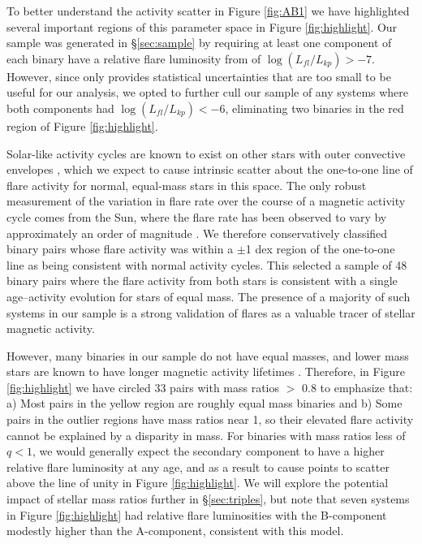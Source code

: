 \documentclass[preprint2]{aastex61}
\begin{document}
To better understand the activity scatter in Figure \ref{fig:AB1} we have highlighted several important regions of this parameter space in Figure \ref{fig:highlight}. Our sample was generated in \S\ref{sec:sample} by requiring at least one component of each binary have a relative flare luminosity from \citet{davenport2016} of $\log(L_{fl}/L_{kp}) > -7$. However, since \citet{davenport2016} only provides statistical uncertainties that are too small to be useful for our analysis, we opted to further cull our sample of any systems where both components had $\log(L_{fl}/L_{kp}) < -6$, eliminating two binaries in the red region of Figure \ref{fig:highlight}.

Solar-like activity cycles are known to exist on other stars with outer convective envelopes \citep[e.g.][]{see2016}, which we expect to cause intrinsic scatter about the one-to-one line of flare activity for normal, equal-mass stars in this space. The only robust measurement of the variation in flare rate over the course of a magnetic activity cycle comes from the Sun, where the flare rate has been observed to vary by approximately an order of magnitude \citep{veronig2002}. We therefore conservatively classified binary pairs whose flare activity was within a $\pm$1 dex region of the one-to-one line as being consistent with normal activity cycles. This selected a sample of 48 binary pairs where the flare activity from both stars is consistent with a single age--activity evolution for stars of equal mass. The presence of a majority of such systems in our sample is a strong validation of flares as a valuable tracer of stellar magnetic activity.


However, many binaries in our sample do not have equal masses, and lower mass stars are known to have longer magnetic activity lifetimes \citep{west2008}. Therefore, in Figure \ref{fig:highlight} we have circled 33 pairs with mass ratios $>$ 0.8 to emphasize that: a) Most pairs in the yellow region are roughly equal mass binaries and b) Some pairs in the outlier regions have mass ratios near 1, so their elevated flare activity cannot be explained by a disparity in mass. For binaries with mass ratios less of $q<1$, we would generally expect the secondary component to have a higher relative flare luminosity at any age, and as a result to cause points to scatter above the line of unity in Figure \ref{fig:highlight}. We will explore the potential impact of stellar mass ratios further in \S\ref{sec:triples}, but note that seven systems in Figure \ref{fig:highlight} had relative flare luminosities with the B-component modestly higher than the A-component, consistent with this model.
\end{document}
